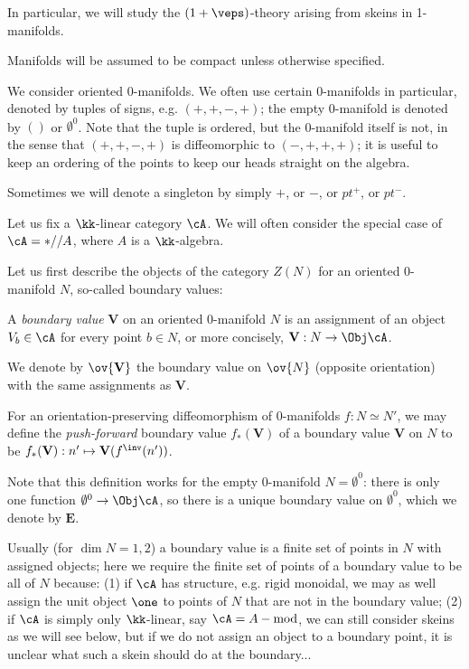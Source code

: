 \documentclass[12pt]{article}
\newcommand{\empt}[1]{{\emptyset^{#1}}}
\newcommand{\VV}{{\mathbf{V}}}
\newcommand{\EE}{{\mathbf{E}}}
\begin{document}
In particular, we will study the $(1+\veps)$-theory
arising from skeins in 1-manifolds.

Manifolds will be assumed to be compact
unless otherwise specified.

We consider oriented 0-manifolds.
We often use certain 0-manifolds in particular,
denoted by tuples of signs, e.g. $(+,+,-,+)$;
the empty 0-manifold is denoted by $()$ or $\empt{0}$.
Note that the tuple is ordered, but the 0-manifold itself
is not, in the sense that
$(+,+,-,+)$ is diffeomorphic to $(-,+,+,+)$;
it is useful to keep an ordering of the points
to keep our heads straight on the algebra.

Sometimes we will denote a singleton by simply $+$,
or $-$, or $pt^+$, or $pt^-$.

Let us fix a $\kk$-linear category $\cA$.
We will often consider the special case of
$\cA = *//A$, where $A$ is a $\kk$-algebra.

Let us first describe the objects of the category
$Z(N)$ for an oriented 0-manifold $N$,
so-called boundary values:

\begin{definition}
A \emph{boundary value} $\VV$ on an oriented 0-manifold $N$
is an assignment of an object $V_b \in \cA$
for every point $b \in N$,
or more concisely, $\VV: N \to \Obj \cA$.

We denote by $\ov{\VV}$ the boundary value on $\ov{N}$
(opposite orientation) with the same assignments as $\VV$.

For an orientation-preserving diffeomorphism of 0-manifolds
$f: N \simeq N'$,
we may define the \emph{push-forward} boundary value
$f_*(\VV)$ of a boundary value $\VV$ on $N$
to be $f_*(\VV): n' \mapsto \VV(f^\inv(n'))$.
\end{definition}

Note that this definition works for the empty 0-manifold
$N = \empt{0}$: there is only one function $\empt{0} \to \Obj \cA$,
so there is a unique boundary value on $\empt{0}$,
which we denote by $\EE$.

\begin{remark}
\label{r:boundary-value}
Usually (for $\dim N = 1,2$)
a boundary value is a finite set of points in $N$
with assigned objects;
here we require the finite set of points of a boundary value
to be all of $N$ because:
(1) if $\cA$ has structure, e.g. rigid monoidal,
we may as well assign the unit object $\one$ to points
of $N$ that are not in the boundary value;
(2) if $\cA$ is simply only $\kk$-linear,
say $\cA = A-\text{mod}$,
we can still consider skeins as we will see below,
but if we do not assign an object to a boundary point,
it is unclear what such a skein should do at the boundary...
\end{remark}
\end{document}
